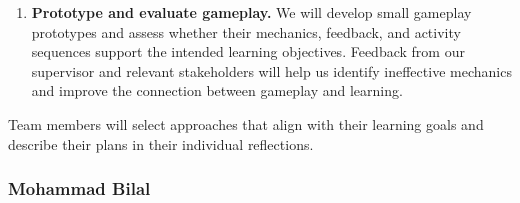 \documentclass[12pt]{article}
\begin{document}
\begin{enumerate}
\begin{itemize}
\begin{enumerate}
            \item \textbf{Prototype and evaluate gameplay.}
            We will develop small gameplay prototypes and assess whether
            their mechanics, feedback, and activity sequences support
            the intended learning objectives. Feedback from our supervisor
            and relevant stakeholders will help us identify ineffective
            mechanics and improve the connection between gameplay
            and learning.
        \end{enumerate}
    \end{itemize}

    Team members will select approaches that align with their learning
    goals and describe their plans in their individual reflections.
    \end{enumerate}

\subsubsection*{Mohammad Bilal}
\end{document}
